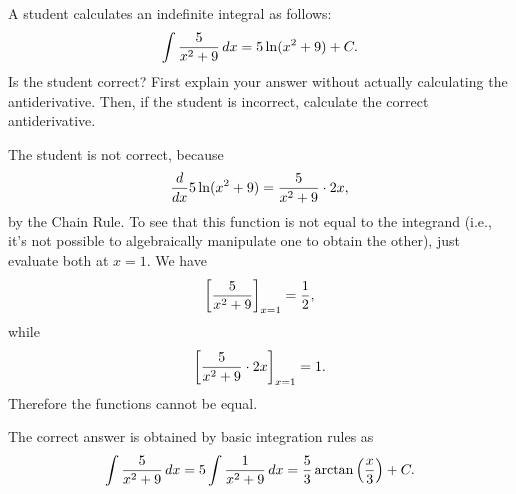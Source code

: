 \documentclass[handout]{ximera}
\begin{document}
\begin{problem}
A student calculates an indefinite integral as follows:
$$
\int \frac{5}{x^2 + 9} \mathop{}\!d x = 5\ln (x^2 + 9) + C.
$$
Is the student correct? First explain your answer without actually calculating the antiderivative. Then, if the student is incorrect, calculate the correct antiderivative.
\end{problem}

\begin{freeResponse} The student is not correct, because 
$$
\frac{\mathop{}\!d}{\mathop{}\!d x} 5 \ln (x^2 + 9) = \frac{5}{x^2 + 9} \cdot 2x,
$$
by the Chain Rule. To see that this function is not equal to the integrand (i.e., it's not possible to algebraically manipulate one to obtain the other), just evaluate both at $x=1$. We have 
$$
\bigg[ \frac{5}{x^2 + 9} \bigg]_{x=1} = \frac{1}{2},
$$
while 
$$
\bigg[ \frac{5}{x^2 + 9} \cdot 2x \bigg]_{x=1} = 1.
$$
Therefore the functions cannot be equal.

The correct answer is obtained by basic integration rules as
$$
\int \frac{5}{x^2 + 9} \mathop{}\!d x = 5 \int \frac{1}{x^2 + 9} \mathop{}\!d x = \frac{5}{3} \arctan \left(\frac{x}{3}\right) + C.
$$
\end{freeResponse}
\end{document}

